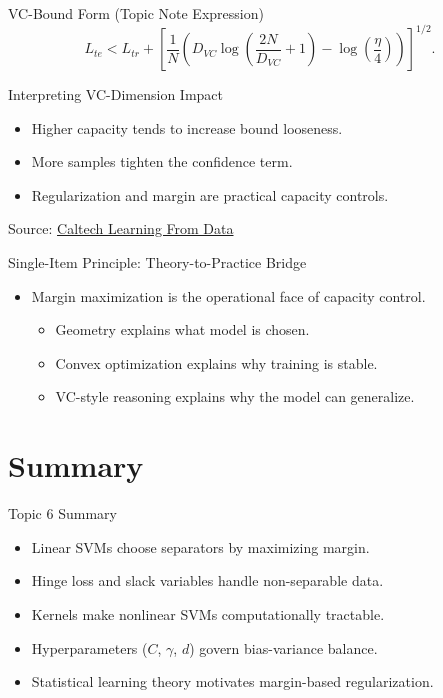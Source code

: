 \documentclass[10pt]{beamer}
\begin{document}
\begin{frame}{VC-Bound Form (Topic Note Expression)}
  \justifying
  \[
    L_{te}
    <
    L_{tr}
    +
    \left[
    \frac{1}{N}
    \left(
      D_{VC}\log\left(\frac{2N}{D_{VC}}+1\right)-\log\left(\frac{\eta}{4}\right)
    \right)
    \right]^{1/2}.
  \]
\end{frame}

\begin{frame}{Interpreting VC-Dimension Impact}
  \justifying
  \begin{itemize}
    \item Higher capacity tends to increase bound looseness.
    \item More samples tighten the confidence term.
    \item Regularization and margin are practical capacity controls.
  \end{itemize}
  \vspace{0.3em}
  \footnotesize
  Source: \href{https://work.caltech.edu/telecourse.html}{Caltech Learning From Data}
\end{frame}

\begin{frame}{Single-Item Principle: Theory-to-Practice Bridge}
  \justifying
  \begin{itemize}
    \item Margin maximization is the operational face of capacity control.
    \begin{itemize}
      \item Geometry explains what model is chosen.
      \item Convex optimization explains why training is stable.
      \item VC-style reasoning explains why the model can generalize.
    \end{itemize}
  \end{itemize}
\end{frame}

\section{Summary}

\begin{frame}{Topic 6 Summary}
  \justifying
  \begin{itemize}
    \item Linear SVMs choose separators by maximizing margin.
    \item Hinge loss and slack variables handle non-separable data.
    \item Kernels make nonlinear SVMs computationally tractable.
    \item Hyperparameters ($C$, $\gamma$, $d$) govern bias-variance balance.
    \item Statistical learning theory motivates margin-based regularization.
  \end{itemize}
\end{frame}
\end{document}
